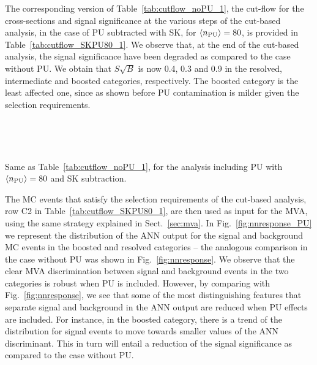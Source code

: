 The corresponding version of Table~\ref{tab:cutflow_noPU_1}, the 
cut-flow for the cross-sections and signal significance at the various
steps of the cut-based analysis, 
in the case
of PU subtracted with SK, for $\left\langle n_{\rm PU}\right\rangle=80$,
is provided in Table~\ref{tab:cutflow_SKPU80_1}.
%
We observe that, at the end of the cut-based analysis,
the signal significance have been  degraded
as compared to the case without PU.
%
We obtain that $S\sqrt{B}$ is now 0.4, 0.3 and 0.9 in the resolved,
intermediate and boosted categories, respectively.
%
The boosted category is the least affected one, since as shown
before PU contamination is milder given the selection requirements.



\begin{table}[t]
  \centering
  \scriptsize
  
  $\,$ \\
  \vspace{0.5cm}
  
  $\,$ \\
  \vspace{0.5cm}
    
    \caption{\small
      Same as Table~\ref{tab:cutflow_noPU_1}, for the analysis
      including PU with $\left\langle n_{\rm PU}\right\rangle=80$ and SK subtraction.
      \label{tab:cutflow_SKPU80_1}}
\end{table}

The MC events that satisfy the selection requirements of the cut-based
analysis, row C2 in Table~\ref{tab:cutflow_SKPU80_1}, are then
used as input for the MVA, 
using the same strategy explained 
in Sect.~\ref{sec:mva}.
%
In Fig.~\ref{fig:nnresponse_PU} we represent
the distribution of the ANN output for the
signal and background MC events in the boosted and resolved categories --
the analogous comparison in the case without PU was shown
in Fig.~\ref{fig:nnresponse}.
%
We observe that the clear MVA discrimination
between signal and background events in the two categories is robust
when PU is included.
%
However, by comparing with Fig.~\ref{fig:nnresponse}, we see
that some of the most distinguishing features that separate signal
and background in the ANN output are reduced when PU effects
are included.
%
For instance, in the boosted category, there is a trend of the distribution
for signal events to move towards smaller values of the
ANN discriminant.
%
This in turn will entail a reduction of the signal significance as
compared to the case without PU.

